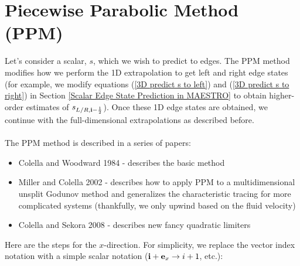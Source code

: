 \newpage

\section{Piecewise Parabolic Method (PPM)}
Let's consider a scalar, $s$, which we wish to predict to edges.  The PPM method
modifies how we perform the 1D extrapolation to get left and right edge states
(for example, we modify equations (\ref{3D predict s to left}) and 
(\ref{3D predict s to right}) in Section 
\ref{Scalar Edge State Prediction in MAESTRO} to obtain higher-order estimates
of $s_{L/R,{\bf i}-\frac{1}{2}}$).  Once these 1D edge states are obtained, we
continue with the full-dimensional extrapolations as described before.\\ \\
The PPM method is described in a series of papers:
\begin{itemize}
\item Colella and Woodward 1984 - describes the basic method
\item Miller and Colella 2002 - describes how to apply PPM to a multidimensional
unsplit Godunov method and generalizes the characteristic tracing for more complicated
systems (thankfully, we only upwind based on the fluid velocity)
\item Colella and Sekora 2008 - describes new fancy quadratic limiters
\end{itemize}
Here are the steps for the $x$-direction.  For simplicity, we replace the vector index notation with a simple scalar notation (${\bf i}+{\bf e}_x \rightarrow i+1$, etc.):
